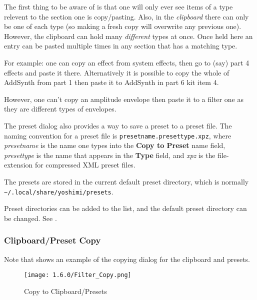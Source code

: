    The first thing to be aware of is that one will only ever see items of a type
   relevent to the section one is copy/pasting. Also, in the \textsl{clipboard}
   there can only be one of each type (so making a fresh copy will overwrite any
   previous one). However, the clipboard can hold many \textsl{different} types at
   once. Once held here an entry can be pasted multiple times in any section that
   has a matching type.

   For example: one can copy an effect from system effects, then go to (say) part 4
   effects and paste it there. Alternatively it is possible to copy the whole of
   AddSynth from part 1 then paste it to AddSynth in part 6 kit item 4.

   However, one can't copy an amplitude envelope then paste it to a filter one as
   they are different types of envelopes.

   The preset dialog also provides a way
   to save a preset to a preset file.
   The naming convention for a preset file is
   \texttt{presetname.presettype.xpz}, where
   \textsl{presetname} is the name one types into the \textbf{Copy to Preset}
   name field, \textsl{presettype} is the name that appears in the
   \textbf{Type} field, and \textsl{xpz} is the file-extension for compressed
   XML preset files.

   The presets are stored in the current default preset directory,
   which is normally\\
   \texttt{\textasciitilde/.local/share/yoshimi/presets}.

   Preset directories can be added to the list, and
   the default preset directory can be changed.
   See .

\subsubsection{Clipboard/Preset Copy}
\label{subsubsec:clipboard_copy}

   Note that \hspace {6 pt}shows an example of the copying
   dialog for the clipboard and presets.

\begin{figure}[H]
   \centering
   \texttt{[image: 1.6.0/Filter\_Copy.png]}
   \caption[Copy to Clipboard/Presets]{Copy to Clipboard/Presets}
   \label{fig:copy_to_clipboard/presets}
\end{figure}

